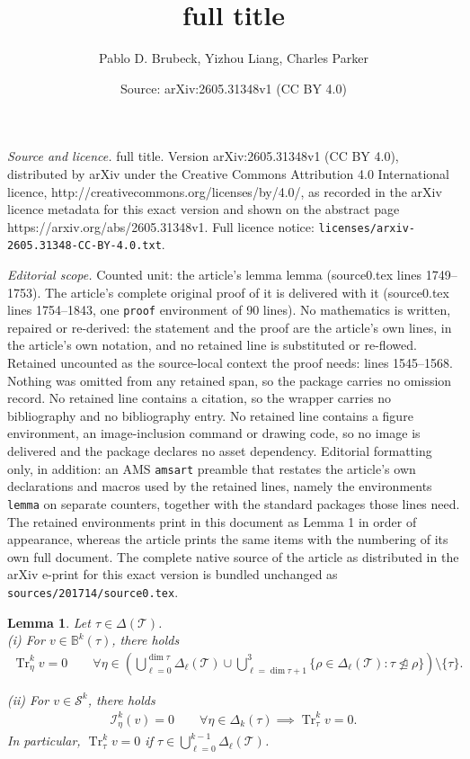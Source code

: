 \documentclass[10pt,a4paper]{amsart}
\title{full title}
\author{Pablo D. Brubeck, Yizhou Liang, Charles Parker}
\date{Source: arXiv:2605.31348v1 (CC BY 4.0)}
\newtheorem{lemma}{Lemma}
\DeclareMathOperator{\Tr}{Tr}
\newcommand{\mesh}[0]{\mathcal{T}}
\DeclareMathOperator{\notsubsimplex}{\ntrianglelefteq}
\begin{document}
\maketitle

\noindent\emph{Source and licence.} full title. Version arXiv:2605.31348v1 (CC BY 4.0), distributed by arXiv under the Creative Commons Attribution 4.0 International licence, http://creativecommons.org/licenses/by/4.0/, as recorded in the arXiv licence metadata for this exact version and shown on the abstract page https://arxiv.org/abs/2605.31348v1. Full licence notice: \texttt{licenses/arxiv-2605.31348-CC-BY-4.0.txt}.\par\smallskip

\noindent\textit{Editorial scope.} Counted unit: the article's lemma lemma (source0.tex lines 1749--1753). The article's complete original proof of it is delivered with it (source0.tex lines 1754--1843, one \texttt{proof} environment of 90 lines). No mathematics is written, repaired or re-derived: the statement and the proof are the article's own lines, in the article's own notation, and no retained line is substituted or re-flowed.  Retained uncounted as the source-local context the proof needs: lines 1545--1568.  Nothing was omitted from any retained span, so the package carries no omission record.  No retained line contains a citation, so the wrapper carries no bibliography and no bibliography entry.  No retained line contains a figure environment, an image-inclusion command or drawing code, so no image is delivered and the package declares no asset dependency.  Editorial formatting only, in addition: an AMS \texttt{amsart} preamble that restates the article's own declarations and macros used by the retained lines, namely the environments \texttt{lemma} on separate counters, together with the standard packages those lines need.  The retained environments print in this document as Lemma 1 in order of appearance, whereas the article prints the same items with the numbering of its own full document.  The complete native source of the article as distributed in the arXiv e-print for this exact version is bundled unchanged as \texttt{sources/201714/source0.tex}.
\begin{lemma}
	\label{lem:support-skeleton-extended-bubble}
	Let $\tau \in \Delta(\mesh)$. \\
	\noindent (i) For $v \in \mathbb{B}^k(\tau)$,
	there holds
	\begin{align}
		\label{eq:modified-bubble-support}
		\Tr^k_{\eta} v = 0 \qquad \forall \eta \in 
		\left( \bigcup_{\ell=0}^{\dim \tau} \Delta_{\ell}(\mesh) 
		\cup \bigcup_{\ell=\dim \tau + 1}^{3} 
		\{ \rho \in \Delta_{\ell}(\mesh) : \tau \notsubsimplex \rho \}
		\right) \setminus \{\tau\}.
	\end{align}
	
	\noindent (ii)  For $v \in \mathcal{S}^k$, 
	there holds
	\begin{align}
		\label{eq:skeletal-support}
		\mathcal{I}^k_{\eta}(v) = 0 \qquad \forall \eta \in \Delta_k(\tau)
		\implies \Tr^k_{\tau} v = 0.
	\end{align}
	In particular, $\Tr^k_{\tau} v = 0$ if
	$\tau \in \bigcup_{\ell = 0}^{k-1} \Delta_{\ell}(\mesh)$.
\end{lemma}
\end{document}
